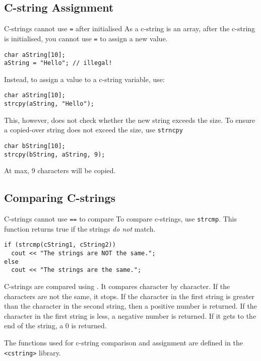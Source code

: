 \documentclass[\main/notes.tex]{subfiles}
\begin{document}
			\subsection{C-string Assignment}
				\begin{sidenote}{C-strings cannot use \texttt{=} after initialised}
					As a c-string is an array, after the c-string is initialised, you cannot use \texttt{=} to assign a new value.
					\begin{verbatim}
char aString[10];
aString = "Hello"; // illegal!
					\end{verbatim}
					Instead, to assign a value to a c-string variable, use:
					\begin{verbatim}
char aString[10];
strcpy(aString, "Hello");
					\end{verbatim}
					This, however, does not check whether the new string exceeds the size. To ensure a copied-over string does not exceed the size, use \texttt{strncpy}
					\begin{verbatim}
char bString[10];
strcpy(bString, aString, 9);
					\end{verbatim}
					At max, $9$ characters will be copied.
				\end{sidenote}

			\subsection{Comparing C-strings}
			\begin{sidenote}{C-strings cannot use \texttt{==} to compare}
				To compare c-strings, use \texttt{strcmp}. This function returns true if the strings \emph{do not} match.
				\begin{verbatim}
if (strcmp(cString1, cString2))
  cout << "The strings are NOT the same.";
else
  cout << "The strings are the same.";
				\end{verbatim}
				C-strings are compared using . It compares character by character. If the characters are not the same, it stops. If the character in the first string is greater than the character in the second string, then a positive number is returned. If the character in the first string is less, a negative number is returned. If it gets to the end of the string, a $0$ is returned.
			\end{sidenote}
			The functions used for c-string comparison and assignment are defined in the \texttt{<cstring>} library.
			\pagebreak
\end{document}
